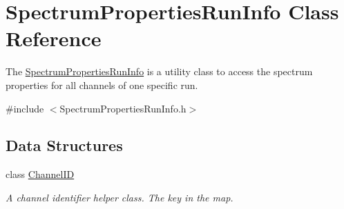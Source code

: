 \hypertarget{class_spectrum_properties_run_info}{\section{Spectrum\-Properties\-Run\-Info Class Reference}
\label{class_spectrum_properties_run_info}
}


The \hyperlink{class_spectrum_properties_run_info}{Spectrum\-Properties\-Run\-Info} is a utility class to access the spectrum properties for all channels of one specific run.  




{\ttfamily \#include $<$Spectrum\-Properties\-Run\-Info.\-h$>$}

\subsection*{Data Structures}
\begin{DoxyCompactItemize}
\item 
class \hyperlink{class_spectrum_properties_run_info_1_1_channel_i_d}{Channel\-I\-D}
\begin{DoxyCompactList}\small\item\em A channel identifier helper class. The key in the map. \end{DoxyCompactList}\end{DoxyCompactItemize}

